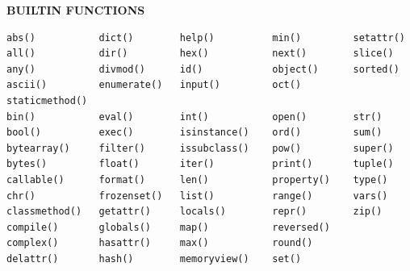 \documentclass[9pt,a4wide]{extarticle}
\begin{document}
\bigskip
{\LARGE\bf BUILTIN FUNCTIONS}
{}

\begin{verbatim}
abs()           dict()        help()          min()         setattr()
all()           dir()         hex()           next()        slice()
any()           divmod()      id()            object()      sorted()
ascii()         enumerate()   input()         oct()         staticmethod()
bin()           eval()        int()           open()        str()
bool()          exec()        isinstance()    ord()         sum()
bytearray()     filter()      issubclass()    pow()         super()
bytes()         float()       iter()          print()       tuple()
callable()      format()      len()           property()    type()
chr()           frozenset()   list()          range()       vars()
classmethod()   getattr()     locals()        repr()        zip()
compile()       globals()     map()           reversed()  
complex()       hasattr()     max()           round() 
delattr()       hash()        memoryview()    set() 
\end{verbatim}

\bigskip
\end{document}
